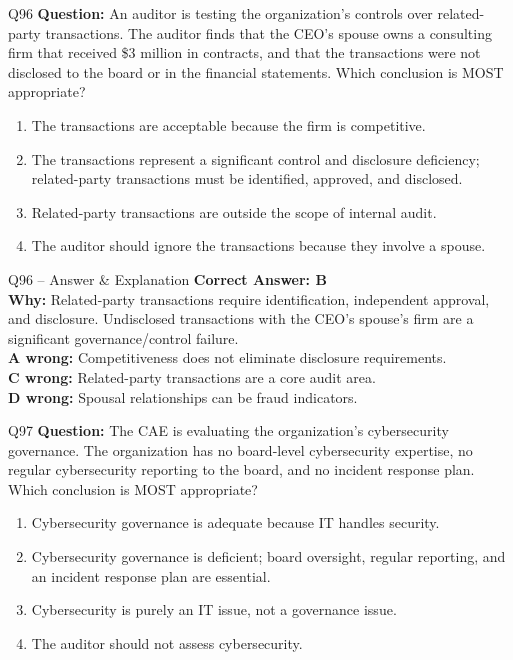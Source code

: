 \documentclass[aspectratio=169,10pt]{beamer}
\begin{document}
	\begin{frame}[t]{Q96}
		\small
		\textbf{Question:} An auditor is testing the organization's controls over related-party transactions. The auditor finds that the CEO's spouse owns a consulting firm that received \$3 million in contracts, and that the transactions were not disclosed to the board or in the financial statements. Which conclusion is MOST appropriate?
		\begin{enumerate}[label=\Alph*.,itemsep=1pt,topsep=2pt]
			\item The transactions are acceptable because the firm is competitive.
			\item The transactions represent a significant control and disclosure deficiency; related-party transactions must be identified, approved, and disclosed.
			\item Related-party transactions are outside the scope of internal audit.
			\item The auditor should ignore the transactions because they involve a spouse.
		\end{enumerate}
	\end{frame}
	
	\begin{frame}[t]{Q96 -- Answer \& Explanation}
		\small
		\textbf{Correct Answer: B} \\[4pt]
		\textbf{Why:} Related-party transactions require identification, independent approval, and disclosure. Undisclosed transactions with the CEO's spouse's firm are a significant governance/control failure. \\[4pt]
		\textbf{A wrong:} Competitiveness does not eliminate disclosure requirements. \\[2pt]
		\textbf{C wrong:} Related-party transactions are a core audit area. \\[2pt]
		\textbf{D wrong:} Spousal relationships can be fraud indicators.
	\end{frame}
	
	\begin{frame}[t]{Q97}
		\small
		\textbf{Question:} The CAE is evaluating the organization's cybersecurity governance. The organization has no board-level cybersecurity expertise, no regular cybersecurity reporting to the board, and no incident response plan. Which conclusion is MOST appropriate?
		\begin{enumerate}[label=\Alph*.,itemsep=1pt,topsep=2pt]
			\item Cybersecurity governance is adequate because IT handles security.
			\item Cybersecurity governance is deficient; board oversight, regular reporting, and an incident response plan are essential.
			\item Cybersecurity is purely an IT issue, not a governance issue.
			\item The auditor should not assess cybersecurity.
		\end{enumerate}
	\end{frame}
	
\end{document}
